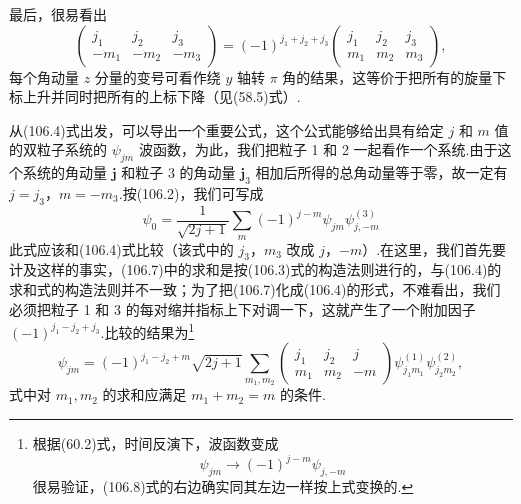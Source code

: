 最后，很易看出
\begin{equation}
  \left(\begin{array}{ccc}j_1&j_2&j_3\\-m_1&-m_2&-m_3\end{array}\right)
  =(-1)^{j_1+j_2+j_3}
  \left(\begin{array}{ccc}j_1&j_2&j_3\\m_1&m_2&m_3\end{array}\right),
\end{equation}
每个角动量 $z$ 分量的变号可看作绕 $y$ 轴转 $\pi$ 角的结果，这等价于把所有的旋量下标上升并同时把所有的上标下降（见(58.5)式）.

从(106.4)式出发，可以导出一个重要公式，这个公式能够给出具有给定 $j$ 和 $m$ 值的双粒子系统的 $\psi_{jm}$ 波函数，为此，我们把粒子 1 和 2 一起看作一个系统.由于这个系统的角动量 $\boldsymbol{j}$ 和粒子 3 的角动量 $\boldsymbol{j}_3$ 相加后所得的总角动量等于零，故一定有 $j=j_3$，$m=-m_3$.按(106.2)，我们可写成
\begin{equation}
  \psi_0=\frac{1}{\sqrt{2j+1}}\sum_m(-1)^{j-m}
  \psi_{jm}\psi^{(3)}_{j,-m}
\end{equation}
此式应该和(106.4)式比较（该式中的 $j_3$，$m_3$ 改成 $j$，$-m$）.在这里，我们首先要计及这样的事实，(106.7)中的求和是按(106.3)式的构造法则进行的，与(106.4)的求和式的构造法则并不一致；为了把(106.7)化成(106.4)的形式，不难看出，我们必须把粒子 1 和 3 的每对缩并指标上下对调一下，这就产生了一个附加因子 $(-1)^{j_1-j_2+j_3}$.比较的结果为\footnote{根据(60.2)式，时间反演下，波函数变成
\begin{equation*}
  \psi_{jm}\to(-1)^{j-m}\psi_{j,-m}
\end{equation*}
很易验证，(106.8)式的右边确实同其左边一样按上式变换的.}
\begin{equation}
  \psi_{jm}=(-1)^{j_1-j_2+m}\sqrt{2j+1}\sum_{m_1,m_2}
  \left(\begin{array}{ccc}j_1&j_2&j\\m_1&m_2&-m\end{array}\right)
  \psi^{(1)}_{j_1m_1}\psi^{(2)}_{j_2m_2},
\end{equation}
式中对 $m_1,m_2$ 的求和应满足 $m_1+m_2=m$ 的条件.

